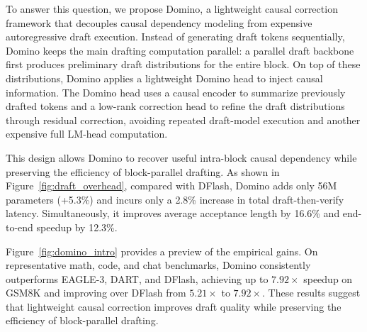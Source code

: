 \documentclass{llmxive}
\begin{document}
To answer this question, we propose Domino, a lightweight causal correction framework that decouples causal dependency modeling from expensive autoregressive draft execution. Instead of generating draft tokens sequentially, Domino keeps the main drafting computation parallel: a parallel draft backbone first produces preliminary draft distributions for the entire block. On top of these distributions, Domino applies a lightweight Domino head to inject causal information. The Domino head uses a causal encoder to summarize previously drafted tokens and a low-rank correction head to refine the draft distributions through residual correction, avoiding repeated draft-model execution and another expensive full LM-head computation.

This design allows Domino to recover useful intra-block causal dependency while preserving the efficiency of block-parallel drafting. As shown in Figure~\ref{fig:draft_overhead}, compared with DFlash, Domino adds only 56M parameters (+5.3\%) and incurs only a 2.8\% increase in total draft-then-verify latency. Simultaneously, it improves average acceptance length by 16.6\% and end-to-end speedup by 12.3\%. 

Figure~\ref{fig:domino_intro} provides a preview of the empirical gains. 
On representative math, code, and chat benchmarks, Domino consistently outperforms EAGLE-3, DART, and DFlash, achieving up to \(7.92\times\) speedup on GSM8K and improving over DFlash from \(5.21\times\) to \(7.92\times\). 
These results suggest that lightweight causal correction improves draft quality while preserving the efficiency of block-parallel drafting.




\end{document}
